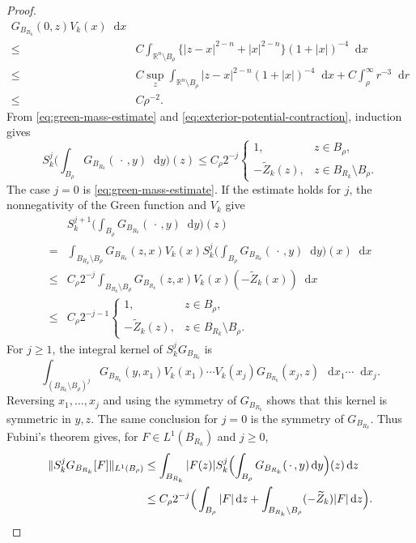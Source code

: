 \documentclass[11pt]{article}
\numberwithin{equation}{section}
\theoremstyle{remark}
\newcommand{\R}{\mathbb R}
\newcommand{\dd}{\mathop{}\!\mathrm{d}}
\begin{document}
\begin{proof}
{\[\begin{aligned}
      {G_{B_{R_k}}(0,z)}V_k(x)\dd x\\
 {}\le{}&C\int_{\R^n\setminus B_\rho}
 \big\{|z-x|^{2-n}+|x|^{2-n}\big\}(1+|x|)^{-4}\dd x
 \\[-2mm]
 {}\le{}&C\sup_z
 \int_{\R^n\setminus B_\rho}|z-x|^{2-n}(1+|x|)^{-4}\dd x
 +C\int_\rho^\infty r^{-3}\dd r\\
 {}\le{}&C\rho^{-2}.
\end{aligned}
\]
}
From \eqref{eq:green-mass-estimate} and
\eqref{eq:exterior-potential-contraction}, induction gives
{
\[
 S_k^j\bigg(\int_{B_\rho}G_{B_{R_k}}(\,\cdot\,,y)\dd y\bigg)(z)
 \le C_\rho 2^{-j}
 \begin{cases}
  1,&z\in B_\rho,\\
 -\widetilde Z_k(z),&z\in B_{R_k}\setminus B_\rho.
 \end{cases}
\]
}
The case $j=0$ is \eqref{eq:green-mass-estimate}.  If the estimate holds
for $j$, the nonnegativity of the Green function and $V_k$ 
give
 {
\[
\begin{aligned}
 &S_k^{j+1}\bigg(\int_{B_\rho}
 G_{B_{R_k}}(\,\cdot\,,y)\dd y\bigg)(z)\\
 {}={}&\int_{B_{R_k}\setminus B_\rho}
 G_{B_{R_k}}(z,x)V_k(x)
 S_k^j\bigg(\int_{B_\rho}
 G_{B_{R_k}}(\,\cdot\,,y)\dd y\bigg)(x)\dd x\\
 {}\le{}&C_\rho 2^{-j}
 \int_{B_{R_k}\setminus B_\rho}
 G_{B_{R_k}}(z,x)V_k(x)(-\widetilde Z_k(x))\dd x\\
 {}\le{}&C_\rho 2^{-j-1}
 \begin{cases}
  1,&z\in B_\rho,\\
  -\widetilde Z_k(z),&z\in B_{R_k}\setminus B_\rho.
 \end{cases}
\end{aligned}
\]
}
For \(j\ge1\), the integral kernel of
\(S_k^jG_{B_{R_k}}\) is
\[
 \int_{(B_{R_k}\setminus B_\rho)^j}
 G_{B_{R_k}}(y,x_1)V_k(x_1)\cdots
 V_k(x_j)G_{B_{R_k}}(x_j,z)\,
 \dd x_1\cdots\dd x_j.
\]
Reversing \(x_1,\ldots,x_j\) and using the symmetry of
\(G_{B_{R_k}}\) shows that this kernel is symmetric in \(y,z\).
The same conclusion for \(j=0\) is the symmetry of \(G_{B_{R_k}}\).
Thus Fubini's theorem gives, for
\(F\in L^1(B_{R_k})\) and \(j\ge0\),
{
\[
\begin{aligned}
 \|S_k^jG_{B_{R_k}}[F]\|_{L^1(B_\rho)}
 &\le\int_{B_{R_k}}|F(z)|
 S_k^j\Bigl(\int_{B_\rho}G_{B_{R_k}}(\,\cdot\,,y)\dd y\Bigr)(z)\dd z\\
 &\le C_\rho 2^{-j}\Big(
   \int_{B_\rho}|F|\dd z
   +\int_{B_{R_k}\setminus B_\rho}(-\widetilde Z_k)|F|\dd z\Big).
\end{aligned}
\]}
\end{proof}
\end{document}
